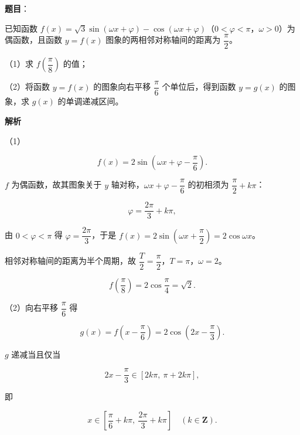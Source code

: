 \begin{answer}

\textbf{题目}：

已知函数 $f(x)=\sqrt3\sin(\omega x+\varphi)-\cos(\omega x+\varphi)$（$0<\varphi<\pi$，$\omega>0$）为偶函数，且函数 $y=f(x)$ 图象的两相邻对称轴间的距离为 $\dfrac{\pi}{2}$。

（1）求 $f\left(\dfrac{\pi}{8}\right)$ 的值；

（2）将函数 $y=f(x)$ 的图象向右平移 $\dfrac{\pi}{6}$ 个单位后，得到函数 $y=g(x)$ 的图象，求 $g(x)$ 的单调递减区间。

\textbf{解析}

（1）

\nopagebreak[4]
\[f(x)=2\sin\left(\omega x+\varphi-\frac{\pi}6\right).\]

$f$ 为偶函数，故其图象关于 $y$ 轴对称，$\omega x+\varphi-\dfrac{\pi}6$ 的初相须为 $\dfrac{\pi}2+k\pi$：

\nopagebreak[4]
\[\varphi=\frac{2\pi}3+k\pi,\]

由 $0<\varphi<\pi$ 得 $\varphi=\dfrac{2\pi}3$，于是 $f(x)=2\sin\left(\omega x+\dfrac{\pi}2\right)=2\cos\omega x$。

相邻对称轴间的距离为半个周期，故 $\dfrac{T}2=\dfrac{\pi}2$，$T=\pi$，$\omega=2$。

\nopagebreak[4]
\[f\left(\frac{\pi}8\right)=2\cos\frac{\pi}4=\sqrt2.\]

（2）向右平移 $\dfrac{\pi}6$ 得

\nopagebreak[4]
\[g(x)=f\left(x-\frac{\pi}6\right)=2\cos\left(2x-\frac{\pi}3\right).\]

$g$ 递减当且仅当

\nopagebreak[4]
\[2x-\frac{\pi}3\in\left[2k\pi,\ \pi+2k\pi\right],\]

即

\nopagebreak[4]
\[x\in\left[\frac{\pi}6+k\pi,\ \frac{2\pi}3+k\pi\right]\quad(k\in\mathbf Z).\]


\end{answer}
